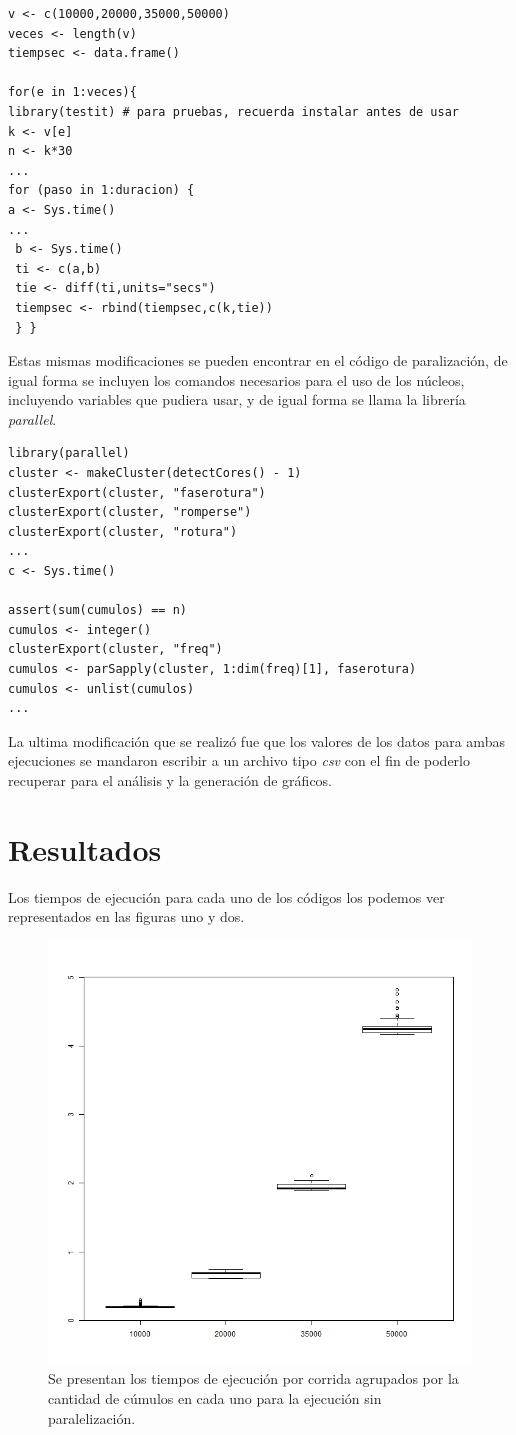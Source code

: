 \documentclass[a4paper]{article}
\begin{document}
\begin{lstlisting}[frame=single]
v <- c(10000,20000,35000,50000)
veces <- length(v)
tiempsec <- data.frame()

for(e in 1:veces){
library(testit) # para pruebas, recuerda instalar antes de usar
k <- v[e]
n <- k*30
...
for (paso in 1:duracion) {
a <- Sys.time()
...
 b <- Sys.time()
 ti <- c(a,b)
 tie <- diff(ti,units="secs")
 tiempsec <- rbind(tiempsec,c(k,tie))
 } }
\end{lstlisting}

Estas mismas modificaciones se pueden encontrar en el código de paralización, de igual forma se incluyen los comandos necesarios para el uso de los núcleos, incluyendo variables que pudiera usar, y de igual forma se llama la librería \textit{parallel}.

\begin{lstlisting}[frame=single]
library(parallel)
cluster <- makeCluster(detectCores() - 1)
clusterExport(cluster, "faserotura")
clusterExport(cluster, "romperse")
clusterExport(cluster, "rotura")
...
c <- Sys.time()

assert(sum(cumulos) == n)
cumulos <- integer()
clusterExport(cluster, "freq")
cumulos <- parSapply(cluster, 1:dim(freq)[1], faserotura)
cumulos <- unlist(cumulos)
...
\end{lstlisting}

La ultima modificación que se realizó fue que los valores de los datos para ambas ejecuciones se mandaron escribir a un archivo tipo \textit{csv} con el fin de poderlo recuperar para el análisis y la generación de gráficos.
\section{Resultados}
Los tiempos de ejecución para cada uno de los códigos los podemos ver representados en las figuras uno y dos.
\begin{figure}[h]
\centering
\includegraphics[width=0.7\linewidth]{Vnoparalelo}
\caption{Se presentan los tiempos de ejecución por corrida agrupados por la cantidad de cúmulos en cada uno para la ejecución sin paralelización.}
\label{fig:Vnoparalelo}
\end{figure}
\end{document}
